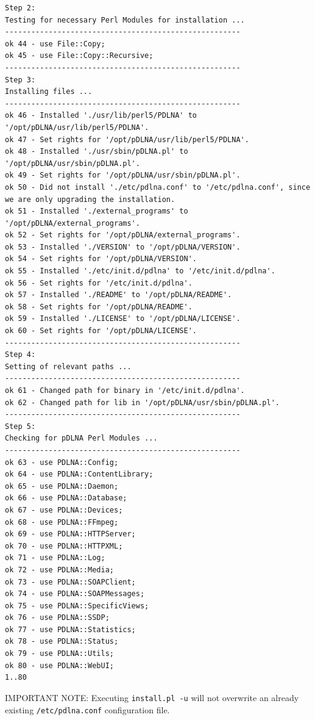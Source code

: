 \documentclass[a4paper,oneside,10pt]{report}
\newenvironment{colframecmd}{%
  \begin{Sbox}
    \begin{minipage}{.99\columnwidth}
}{%
  \end{minipage}
  \end{Sbox}
  \begin{center}
    \fcolorbox{black}{LightSteelBlue}{\TheSbox}
  \end{center}
}
\newenvironment{colframeimportantnote}{%
  \begin{Sbox}
    \begin{minipage}{.99\columnwidth}
}{%
  \end{minipage}
  \end{Sbox}
  \begin{center}
    \fcolorbox{black}{Orange}{\TheSbox}
  \end{center}
}
\begin{document}
\begin{colframecmd}
\begin{verbatim}
Step 2:
Testing for necessary Perl Modules for installation ...
------------------------------------------------------
ok 44 - use File::Copy;
ok 45 - use File::Copy::Recursive;
------------------------------------------------------
Step 3:
Installing files ...
------------------------------------------------------
ok 46 - Installed './usr/lib/perl5/PDLNA' to '/opt/pDLNA/usr/lib/perl5/PDLNA'.
ok 47 - Set rights for '/opt/pDLNA/usr/lib/perl5/PDLNA'.
ok 48 - Installed './usr/sbin/pDLNA.pl' to '/opt/pDLNA/usr/sbin/pDLNA.pl'.
ok 49 - Set rights for '/opt/pDLNA/usr/sbin/pDLNA.pl'.
ok 50 - Did not install './etc/pdlna.conf' to '/etc/pdlna.conf', since we are only upgrading the installation.
ok 51 - Installed './external_programs' to '/opt/pDLNA/external_programs'.
ok 52 - Set rights for '/opt/pDLNA/external_programs'.
ok 53 - Installed './VERSION' to '/opt/pDLNA/VERSION'.
ok 54 - Set rights for '/opt/pDLNA/VERSION'.
ok 55 - Installed './etc/init.d/pdlna' to '/etc/init.d/pdlna'.
ok 56 - Set rights for '/etc/init.d/pdlna'.
ok 57 - Installed './README' to '/opt/pDLNA/README'.
ok 58 - Set rights for '/opt/pDLNA/README'.
ok 59 - Installed './LICENSE' to '/opt/pDLNA/LICENSE'.
ok 60 - Set rights for '/opt/pDLNA/LICENSE'.
------------------------------------------------------
Step 4:
Setting of relevant paths ...
------------------------------------------------------
ok 61 - Changed path for binary in '/etc/init.d/pdlna'.
ok 62 - Changed path for lib in '/opt/pDLNA/usr/sbin/pDLNA.pl'.
------------------------------------------------------
Step 5:
Checking for pDLNA Perl Modules ...
------------------------------------------------------
ok 63 - use PDLNA::Config;
ok 64 - use PDLNA::ContentLibrary;
ok 65 - use PDLNA::Daemon;
ok 66 - use PDLNA::Database;
ok 67 - use PDLNA::Devices;
ok 68 - use PDLNA::FFmpeg;
ok 69 - use PDLNA::HTTPServer;
ok 70 - use PDLNA::HTTPXML;
ok 71 - use PDLNA::Log;
ok 72 - use PDLNA::Media;
ok 73 - use PDLNA::SOAPClient;
ok 74 - use PDLNA::SOAPMessages;
ok 75 - use PDLNA::SpecificViews;
ok 76 - use PDLNA::SSDP;
ok 77 - use PDLNA::Statistics;
ok 78 - use PDLNA::Status;
ok 79 - use PDLNA::Utils;
ok 80 - use PDLNA::WebUI;
1..80
\end{verbatim}
\end{colframecmd}

\begin{colframeimportantnote}
\textsc{IMPORTANT NOTE:} Executing \verb|install.pl -u| will not overwrite an already existing \verb|/etc/pdlna.conf| configuration file.
\end{colframeimportantnote}
\end{document}
